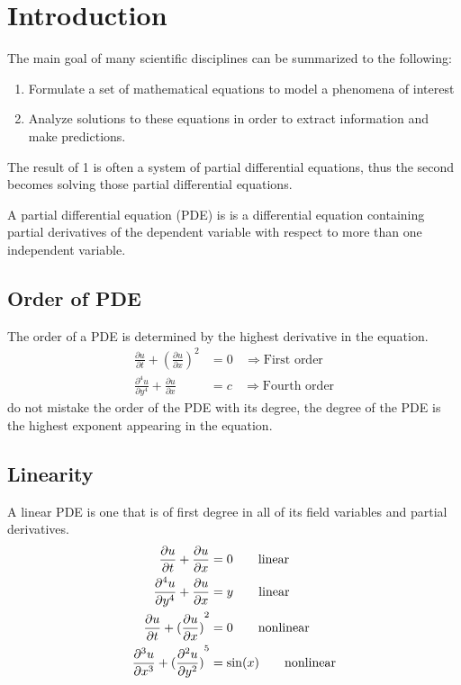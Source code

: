 \documentclass[]{article}
\begin{document}
\newpage 

\tableofcontents

\newpage


\section{Introduction}
The main goal of many scientific disciplines can be summarized to the following:

\begin{enumerate}
\item Formulate a set of mathematical equations to model a phenomena of interest
\item Analyze solutions to these equations in order to extract information and make predictions.
\end{enumerate}

The result of 1 is often a system of partial differential equations, thus the second becomes solving those partial differential equations.
\par
A partial differential equation (PDE) is is a differential equation containing partial derivatives of the dependent variable with respect to more than one independent variable.

\subsection{Order of PDE}
The order of a PDE is determined by the highest derivative in the equation.
\begin{align*}
\frac{\partial u}{\partial t} + {(\frac{\partial u}{\partial x})}^2 &= 0 \ \ \ \ \Longrightarrow  \text{First order}
\\
\frac{\partial^4 u}{\partial y^4} + \frac{\partial u}{\partial x} &= c \ \ \ \ \Longrightarrow  \text{Fourth order}
\end{align*}
do not mistake the order of the PDE with its degree, the degree of the PDE is the highest exponent appearing in the equation.
\subsection{Linearity} 
A linear PDE is one that is of first degree in all of its field variables and partial derivatives.
\begin{align*}
\frac{\partial u}{\partial t} + \frac{\partial u}{\partial x} &= 0 \quad\quad \text{linear}
\\
\frac{\partial^4 u}{\partial y^4} + \frac{\partial u}{\partial x} &= y \quad\quad \text{linear}
\\
\frac{\partial u}{\partial t} + {(\frac{\partial u}{\partial x})}^2 &= 0 \quad\quad \text{nonlinear}
\\
\frac{\partial^3 u}{\partial x^3} + {(\frac{\partial^2 u}{\partial y^2})}^5 &= \sin(x) \quad\quad \text{nonlinear}
\end{align*}
\end{document}
